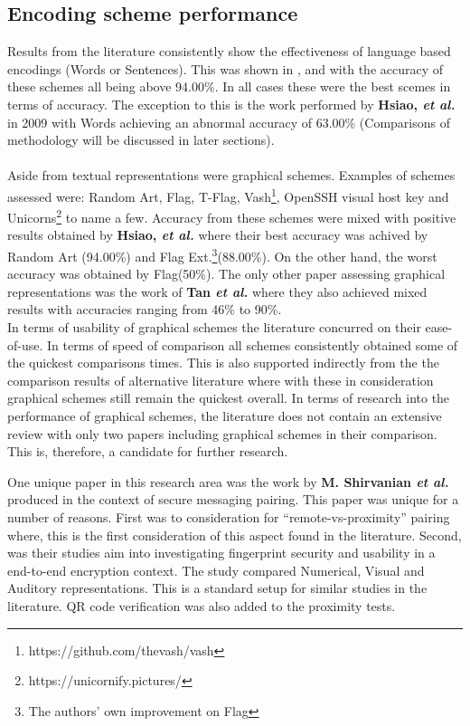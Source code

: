 \subsection*{Encoding scheme performance}
Results 
from the literature consistently show the effectiveness of language based encodings (Words or Sentences). This was shown in \cite{dechand2016empirical}, \cite{tan2017can} and \cite{kainda2009usability} with the accuracy of these schemes all being above 94.00\%. In all cases these were the best scemes in terms of accuracy. The exception to this is the work performed by \textbf{Hsiao, \textit{et al.}}\cite{hsiao2009study} in 2009 with Words achieving an abnormal accuracy of 63.00\% (Comparisons of methodology will be discussed in later sections).
\\\\
Aside from textual representations were graphical schemes. Examples of schemes assessed were: Random Art\cite{perrig1999hash}, Flag\cite{ellison2003public}, T-Flag\cite{lin2010spate}, Vash\footnote{https://github.com/thevash/vash}, OpenSSH visual host key and Unicorns\footnote{https://unicornify.pictures/} to name a few. Accuracy from these schemes were mixed with positive results obtained by \textbf{Hsiao, \textit{et al.}}\cite{hsiao2009study} where their best accuracy was achived by Random Art (94.00\%) and Flag Ext.\footnote{The authors' own improvement on Flag}(88.00\%). On the other hand, the worst accuracy was obtained by Flag(50\%). The only other paper assessing graphical representations was the work of \textbf{Tan \textit{et al.}}\cite{tan2017can} where they also achieved mixed results with accuracies ranging from 46\% to 90\%.
\\
In terms of usability of graphical schemes the literature concurred on their ease-of-use. In terms of speed of comparison all schemes consistently obtained some of the quickest comparisons times. This is also supported indirectly from the the comparison results of alternative literature \cite{kainda2009usability}\cite{dechand2016empirical} where with these in consideration graphical schemes still remain the quickest overall.
In terms of research into the performance of graphical schemes, the literature does not contain an extensive review with only two papers including graphical schemes in their comparison. This is, therefore, a candidate for further research.

One unique paper in this research area was the work by \textbf{M. Shirvanian \textit{et al.}}\cite{shirvanian2017pitfalls} produced in the context of secure messaging pairing. This paper was unique for a number of reasons. First was to consideration for ``remote-vs-proximity'' pairing where, this is the first consideration of this aspect found in the literature. Second, was their studies aim into investigating fingerprint security and usability in a end-to-end encryption context. The study compared Numerical, Visual and Auditory representations. This is a standard setup for similar studies in the literature. QR code verification was also added to the proximity tests.

